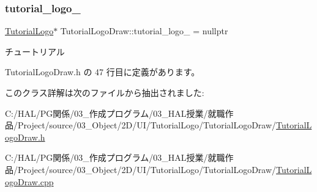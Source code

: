 \mbox{\label{class_tutorial_logo_draw_ab357c25048d3582466a24234896adf3f}} 
\subsubsection{\texorpdfstring{tutorial\+\_\+logo\+\_\+}{tutorial\_logo\_}}
{\footnotesize\ttfamily \mbox{\hyperlink{class_tutorial_logo}{Tutorial\+Logo}}$\ast$ Tutorial\+Logo\+Draw\+::tutorial\+\_\+logo\+\_\+ = nullptr\hspace{0.3cm}{\ttfamily [private]}}



チュートリアル 



 Tutorial\+Logo\+Draw.\+h の 47 行目に定義があります。



このクラス詳解は次のファイルから抽出されました\+:\begin{DoxyCompactItemize}
\item 
C\+:/\+H\+A\+L/\+P\+G関係/03\+\_\+作成プログラム/03\+\_\+\+H\+A\+L授業/就職作品/\+Project/source/03\+\_\+\+Object/2\+D/\+U\+I/\+Tutorial\+Logo/\+Tutorial\+Logo\+Draw/\mbox{\hyperlink{_tutorial_logo_draw_8h}{Tutorial\+Logo\+Draw.\+h}}\item 
C\+:/\+H\+A\+L/\+P\+G関係/03\+\_\+作成プログラム/03\+\_\+\+H\+A\+L授業/就職作品/\+Project/source/03\+\_\+\+Object/2\+D/\+U\+I/\+Tutorial\+Logo/\+Tutorial\+Logo\+Draw/\mbox{\hyperlink{_tutorial_logo_draw_8cpp}{Tutorial\+Logo\+Draw.\+cpp}}\end{DoxyCompactItemize}

